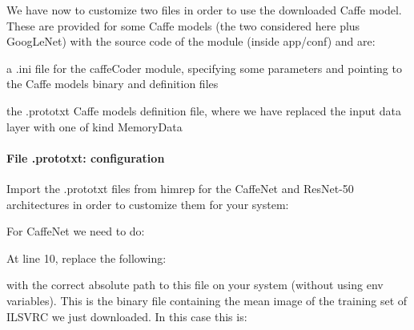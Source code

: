 We have now to customize two files in order to use the downloaded Caffe model. These are provided for some Caffe models (the two considered here plus {\ttfamily Goog\+Le\+Net}) with the source code of the module (inside {\ttfamily app/conf}) and are\+:


\begin{DoxyItemize}
\item a {\ttfamily .ini} file for the {\ttfamily caffe\+Coder} module, specifying some parameters and pointing to the Caffe model\textquotesingle{}s binary and definition files
\item the {\ttfamily .prototxt} Caffe model\textquotesingle{}s definition file, where we have replaced the input data layer with one of kind {\ttfamily Memory\+Data}
\end{DoxyItemize}

\paragraph*{File .prototxt\+: configuration}

Import the {\ttfamily .prototxt} files from {\ttfamily himrep} for the {\ttfamily Caffe\+Net} and {\ttfamily Res\+Net-\/50} architectures in order to customize them for your system\+:


\begin{DoxyCode}{0}
\end{DoxyCode}


For {\ttfamily Caffe\+Net} we need to do\+:


\begin{DoxyCode}{0}
\end{DoxyCode}


At line 10, replace the following\+:


\begin{DoxyCode}{0}
\end{DoxyCode}


with the correct absolute path to this file on your system (without using env variables). This is the binary file containing the mean image of the training set of I\+L\+S\+V\+RC we just downloaded. In this case this is\+:


